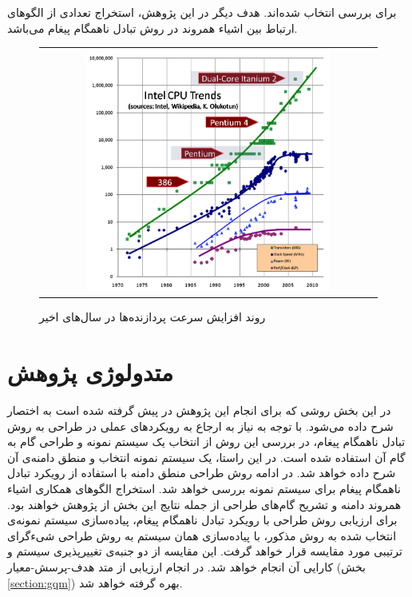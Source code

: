 برای بررسی انتخاب شده‌اند. هدف دیگر در این پژوهش، استخراج تعدادی از الگوهای ارتباط بین اشیاء همروند در روش تبادل ناهمگام پیغام می‌باشد. 
	 \begin{figure}
    \begin{center}
    \begin{tabular}{ c }
  	 \includegraphics[width=12cm,height=8cm]{1-Introduction/Figures/Moore.png}
  \end{tabular}
  \end{center}
   \caption[روند افزایش سرعت پردازنده‌ها در سال‌های اخیر]{\label{fig:CPU_Trend} روند افزایش سرعت پردازنده‌ها در سال‌های اخیر\protect\cite{Sutter05thefree}}
\end{figure}
 
\section{متدولوژی پژوهش}
در این بخش روشی که برای انجام این پژوهش در پیش گرفته شده است به اختصار شرح داده می‌شود. با توجه به نیاز به ارجاع به رویکردهای عملی در طراحی به روش تبادل ناهمگام پیغام، در بررسی این روش از انتخاب یک سیستم نمونه و طراحی گام به گام آن استفاده شده است. در این راستا، یک سیستم نمونه انتخاب و منطق دامنه‌ی آن شرح داده خواهد شد. در ادامه روش طراحی منطق دامنه با استفاده از رویکرد تبادل ناهمگام پیغام برای سیستم نمونه بررسی خواهد شد. استخراج الگوهای همکاری اشیاء همروند دامنه و تشریح گام‌های طراحی از جمله نتایج این بخش از پژوهش خواهند بود. 
 برای ارزیابی روش طراحی با رویکرد تبادل ناهمگام پیغام، پیاده‌سازی سیستم نمونه‌ی انتخاب شده به روش مذکور، با پیاده‌سازی همان سیستم به روش طراحی شیءگرای ترتیبی مورد مقایسه قرار خواهد گرفت. این مقایسه از دو جنبه‌ی تغییرپذیری سیستم و کارایی آن انجام خواهد شد. در انجام ارزیابی از متد هدف-پرسش-معیار (بخش \ref{section:gqm}) بهره گرفته خواهد شد.
